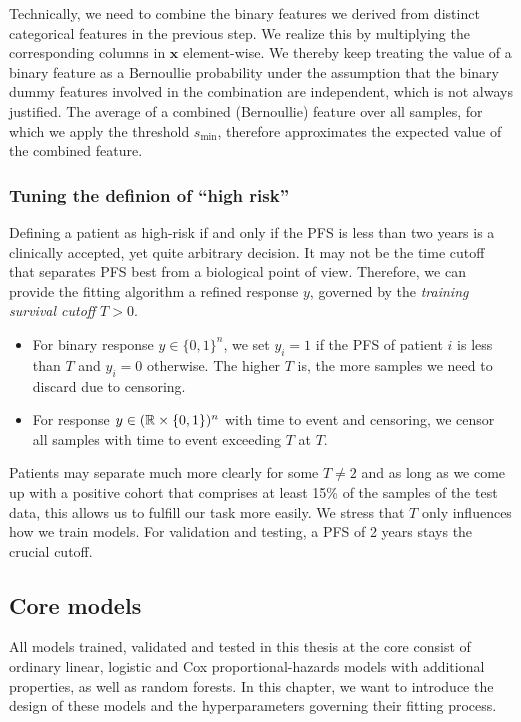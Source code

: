 Technically, we need to combine the binary features we derived from distinct categorical features 
in the previous step. We realize this by multiplying the corresponding columns in 
$\mathbf{x}$ element-wise. We thereby keep treating the value of a binary feature as a Bernoullie
probability under the assumption that the binary dummy features involved in the combination are 
independent, which is not always justified. The average of a combined (Bernoullie) feature over all 
samples, for which we apply the threshold $s_\text{min}$, therefore approximates the expected value 
of the combined feature.

\subsubsection{Tuning the definion of ``high risk''}

Defining a patient as high-risk if and only if the PFS is less than two years
is a clinically accepted, yet quite arbitrary decision. It may not be the time cutoff that 
separates PFS best from a biological point of view. Therefore, we can provide the fitting 
algorithm a refined response $y$, governed by the \textit{training survival cutoff} $T > 0$.
\begin{itemize}
    \item For binary response $y \in \{0, 1\}^n$, we set $y_i = 1$ if the PFS 
        of patient $i$ is less than $T$ and $y_i = 0$ otherwise. The higher $T$ is, the more 
        samples we need to discard due to censoring.
    \item For response $y \in (\mathbb{R} \times \{0, 1\})^n$ with time to event and censoring, we censor 
        all samples with time to event exceeding $T$ at $T$.
\end{itemize}
Patients may separate much more clearly for some $T \neq 2$ and as long as we come up 
with a positive cohort that comprises at least 15\% of the samples of the test data, this allows us 
to fulfill our task more easily. We stress that $T$ only influences how we train models. For 
validation and testing, a PFS of \num{2} years stays the crucial cutoff.

\subsection{Core models}\label{subsec:core-models}

All models trained, validated and tested in this thesis at the core consist of ordinary linear, 
logistic and Cox proportional-hazards models with additional properties, as well as random forests.
In this chapter, we want to introduce the design of these models and the hyperparameters governing 
their fitting process.

